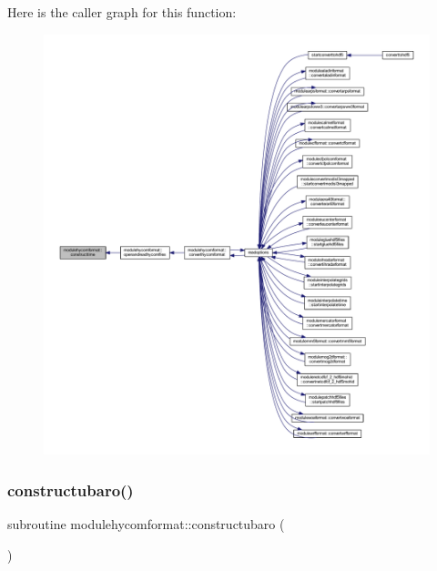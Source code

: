 Here is the caller graph for this function\+:\nopagebreak
\begin{figure}[H]
\begin{center}
\leavevmode
\includegraphics[width=350pt]{namespacemodulehycomformat_ad9fbb9adf5d36be1834e3ca02dacbd89_icgraph}
\end{center}
\end{figure}
\mbox{\label{namespacemodulehycomformat_a781579f6c0af167e5857fa0b7f9caf6a}} 
\subsubsection{\texorpdfstring{constructubaro()}{constructubaro()}}
{\footnotesize\ttfamily subroutine modulehycomformat\+::constructubaro (\begin{DoxyParamCaption}{ }\end{DoxyParamCaption})\hspace{0.3cm}{\ttfamily [private]}}

